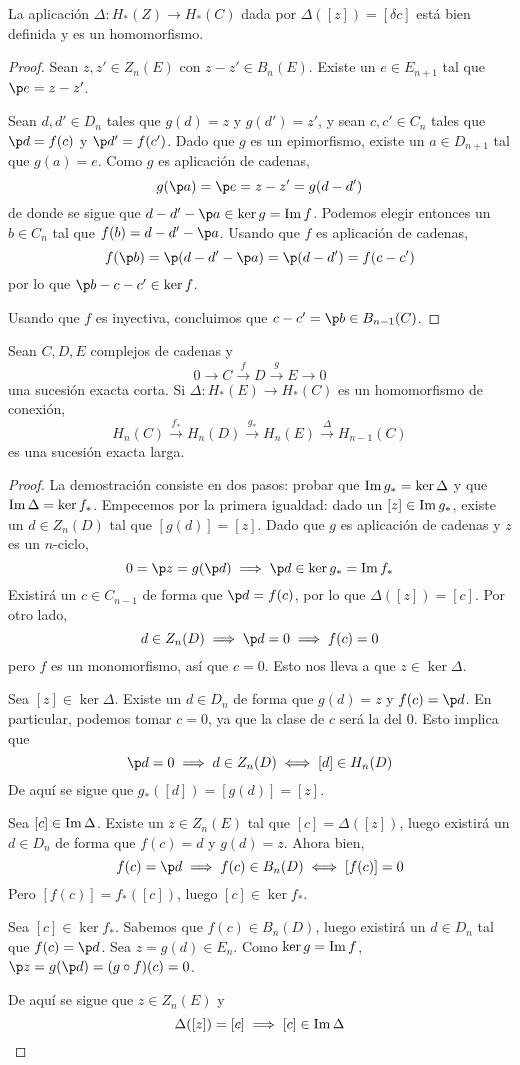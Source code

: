 \begin{proposition}
La aplicación $\Delta\colon H_*(Z) \longrightarrow H_*(C)$ dada por
$\Delta([z])=[\delta c]$ está bien definida y es un homomorfismo.
\end{proposition}

\begin{proof}
Sean $z,z' \in Z_n(E)$ con $z-z' \in B_n(E)$. Existe un $e \in E_{n+1}$ tal que
$\p e=z-z'$.

Sean $d,d' \in D_n$ tales que $g(d)=z$ y $g(d')=z'$, y sean $c,c' \in C_n$ tales
que $\p d=f(c)$ y $\p d'=f(c')$. Dado que $g$ es un epimorfismo, existe un
$a \in D_{n+1}$ tal que $g(a)=e$. Como $g$ es aplicación de cadenas,
\[g(\p a)=\p e=z-z'=g(d-d')\]
de donde se sigue que $d-d'-\p a\in \ker g=\im f$. Podemos elegir entonces un
$b \in C_n$ tal que $f(b)=d-d'-\p a$. Usando que $f$ es aplicación de cadenas,
\[f(\p b)=\p(d-d'-\p a)=\p (d- d')=f(c-c')\]
por lo que $\p b-c-c'\in\ker f$.

Usando que $f$ es inyectiva, concluimos que $c-c'=\p b \in B_{n-1}(C)$.
\end{proof}

\begin{theorem}
Sean $C, D, E$ complejos de cadenas y
\[0 \to C \xrightarrow{ f } D \xrightarrow{ g } E \to 0\]
una sucesión exacta corta. Si $\Delta\colon H_*(E) \to H_*(C)$ es un homomorfismo
de conexión,
\[H_n(C) \xrightarrow{ f_* } H_n(D) \xrightarrow{ g_* } H_n(E)
\xrightarrow{ \Delta } H_{n-1}(C)\] es una sucesión exacta larga.
\end{theorem}

\begin{proof}
	La demostración consiste en dos pasos: probar que $\operatorname{Im} g_*=\ker \Delta$ y que
	$\operatorname{Im} \Delta = \ker f_*$. Empecemos por la primera igualdad: dado un $[z] \in \operatorname{Im}
	g_*$, existe un $d \in Z_n(D)$ tal que $[g(d)]=[z]$. Dado que $g$ es aplicación
	de cadenas y $z$ es un $n$-ciclo,
	\[0=\p z=g(\p d) \implies \p d \in \ker g_*=\im f_*\]
	Existirá un $c \in C_{n-1}$ de forma que $\p d=f(c)$, por lo que $\Delta([z])=
	[c]$. Por otro lado,
	\[d \in Z_n(D) \implies \p d=0 \implies f(c)=0\]
	pero $f$ es un monomorfismo, así que $c=0$. Esto nos lleva a que $z \in
	\ker \Delta$.

	Sea $[z] \in \ker \Delta$. Existe un $d \in D_n$ de forma que $g(d)=z$ y $f(c)=
	\p d$. En particular, podemos tomar $c=0$, ya que la clase de $c$ será la del 0.
	Esto implica que
	\[\p d=0 \implies d \in Z_n(D) \iff [d] \in H_n(D)\]
	De aquí se sigue que $g_*([d])=[g(d)]=[z]$.

	Sea $[c] \in \operatorname{Im} \Delta$. Existe un $z \in Z_n(E)$ tal que $[c]=\Delta([z])$, luego
	existirá un $d \in D_n$ de forma que $f(c)=d$ y $g(d)=z$. Ahora bien,
		\[f(c)= \p d \implies f(c) \in B_n(D) \iff [f(c)]=0\]
	Pero $[f(c)]=f_*([c])$, luego $[c] \in \ker f_*$.

		Sea $[c] \in \ker f_*$.
	Sabemos que $f(c) \in B_n(D)$, luego existirá un $d \in D_n$ tal que $f(c)=\p d$. Sea $z=g(d) \in E_n$.
	Como $\ker g=\operatorname{Im} f$, $\p z=g(\p d)=(g\circ f)(c)=0$.

	De aquí se sigue que $z \in Z_n(E)$ y
	\[\Delta([z])=[c] \implies [c] \in \operatorname{Im} \Delta\]
\end{proof}
